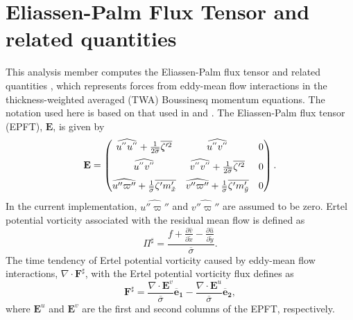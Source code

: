 \newcommand{\Dt}[1]{ \frac{D {#1}}{D t} }
\newcommand{\Dts}[1]{ \frac{D^\sharp {#1}}{D t} }
\newcommand{\ddt}[1]{ \frac{\partial {#1}}{\partial t} }
\newcommand{\ddx}[1]{ \frac{\partial {#1}}{\partial x} }
\newcommand{\ddy}[1]{ \frac{\partial {#1}}{\partial y} }
\newcommand{\ddz}[1]{ \frac{\partial {#1}}{\partial z} }
\newcommand{\ddtb}[1]{ \frac{\partial {#1}}{\partial \tilde{t}} }
\newcommand{\ddxb}[1]{ \frac{\partial {#1}}{\partial \tilde{x}} }
\newcommand{\ddyb}[1]{ \frac{\partial {#1}}{\partial \tilde{y}} }
\newcommand{\ddb}[1]{ \frac{\partial {#1}}{\partial \tilde{b}} }
\newcommand{\ol}{ \overline }


\section{Eliassen-Palm Flux Tensor and related quantities}
\label{sec:AM_eliassen_palm}

This analysis member computes the Eliassen-Palm flux tensor and related quantities \citep{young_2012, maddison_marshall_2013}, which represents forces from eddy-mean flow interactions in the thickness-weighted averaged (TWA) Boussinesq momentum equations.
The notation used here is based on that used in \cite{young_2012} and \cite{saenz_etal_2015a}.
The Eliassen-Palm flux tensor (EPFT), $\mathbf{E}$, is given by
%
\begin{equation}
\mathbf{E} = \left(
\begin{matrix}
  \vspace{0.2 cm}
  \widehat{u^{''}u^{''}} +  \frac{1}{2 \overline \sigma} \overline{{\zeta'^2}} & \widehat{u^{''}v^{''}} & 0 \\
  \vspace{0.2 cm}
  \widehat{u^{''}v^{''}} & \widehat{v^{''}v^{''}} +  \frac{1}{2 \overline \sigma} \overline{{\zeta'^2}} & 0 \\
  \widehat{u'' \varpi''} + \frac{1}{\overline \sigma} \overline{{\zeta' m'_{\tilde x}}}  & \widehat{v'' \varpi''} +  \frac{1}{\overline \sigma} \overline{{\zeta' m'_{\tilde y}}} & 0
 \end{matrix}
 \right ).
\label{eq:fullEPFT}
\end{equation}
%
In the current implementation, $\widehat{u'' \varpi''}$ and $\widehat{v'' \varpi''}$ are assumed to be zero.
Ertel potential vorticity associated with the residual mean flow is defined as
\begin{equation}
\Pi^\sharp = \frac{f + \ddxb{ \hat v } - \ddyb{ \hat u }}{\ol \sigma}.
\label{eq:EPVtwa}
\end{equation}
%
The time tendency of Ertel potential vorticity caused by eddy-mean flow interactions, $\nabla \cdot \mathbf{F}^\sharp$, with the Ertel potential vorticity flux defines as
%
\begin{equation}
\mathbf{F^\sharp} = \frac{\nabla \cdot \mathbf{E}^v}{\ol \sigma} \mathbf{\ol e_1} - 
	\frac{\nabla \cdot \mathbf{E}^u}{\ol \sigma} \mathbf{\ol e_2}, \label{eq:EPV_fluxes_twa}
\end{equation}
%
where $\mathbf{E}^u$ and $\mathbf{E}^v$ are the first and second columns of the EPFT, respectively.

